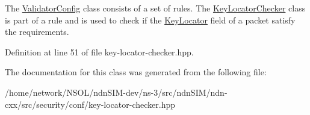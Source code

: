 The \hyperlink{classndn_1_1ValidatorConfig}{Validator\+Config} class consists of a set of rules. The \hyperlink{classndn_1_1security_1_1conf_1_1KeyLocatorChecker}{Key\+Locator\+Checker} class is part of a rule and is used to check if the \hyperlink{classndn_1_1KeyLocator}{Key\+Locator} field of a packet satisfy the requirements. 

Definition at line 51 of file key-\/locator-\/checker.\+hpp.



The documentation for this class was generated from the following file\+:\begin{DoxyCompactItemize}
\item 
/home/network/\+N\+S\+O\+L/ndn\+S\+I\+M-\/dev/ns-\/3/src/ndn\+S\+I\+M/ndn-\/cxx/src/security/conf/key-\/locator-\/checker.\+hpp\end{DoxyCompactItemize}
